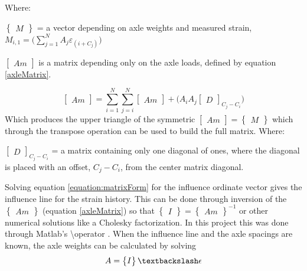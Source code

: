 Where:
\begin{description}
\item $\begin{Bmatrix} M \end{Bmatrix}$ = a vector depending on axle weights and measured strain, $M_{i, 1} = \Big(\sum_{j = 1}^{N} A_j \varepsilon_{(i+C_j)}\Big)$
\item $\begin{bmatrix} Am \end{bmatrix}$ is a matrix depending only on the axle loads, defined by equation \ref{axleMatrix}.
\end{description}
\begin{equation}
\begin{bmatrix} Am \end{bmatrix} = \sum_{i = 1}^{N} \sum_{j = i}^{N} \begin{bmatrix} Am \end{bmatrix} + \big( A_i A_j  \begin{bmatrix} D \end{bmatrix}_{C_j - C_i}\big)
\label{axleMatrix}
\end{equation}
Which produces the upper triangle of the symmetric $ \begin{bmatrix} Am \end{bmatrix} = \begin{Bmatrix} M \end{Bmatrix} $ which through the transpose operation can be used to build the full matrix.
Where:
\begin{description}
\item $\begin{bmatrix} D \end{bmatrix}_{C_j - C_i}$ = a matrix containing only one diagonal of ones, where the diagonal is placed with an offset, $C_j - C_i$, from the center matrix diagonal.
\end{description}
Solving equation \ref{equation:matrixForm} for the influence ordinate vector gives the influence line for the strain history. This can be done through inversion of the $\begin{Bmatrix} Am \end{Bmatrix}$ (equation \ref{axleMatrix}) so that $\begin{Bmatrix} I \end{Bmatrix} = \begin{Bmatrix} Am \end{Bmatrix}^{-1} $ or other numerical solutions like a Cholesky factorization. In this project this was done through Matlab's \textbackslash operator \cite{solver}.
When the influence line and the axle spacings are known, the axle weights can be calculated by solving
\begin{equation}
	A = \begin{Bmatrix} I \end{Bmatrix} \textbackslash \epsilon
\end{equation}
